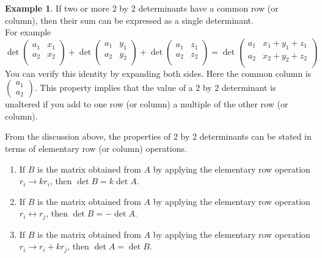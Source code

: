 \documentclass[11pt,a4paper]{article}
\theoremstyle{definition}
\newtheorem{exa}[thm]{Example}
\begin{document}
\begin{exa}
If two or more 2 by 2 determinants have a common row (or column), then their sum can be expressed as a single determinant.\\ For example $$\det
\begin{pmatrix}
a_1&x_1\\a_2&x_2\\
\end{pmatrix}
+\det
\begin{pmatrix}
a_1&y_1\\a_2&y_2\\
\end{pmatrix}
+\det
\begin{pmatrix}
a_1&z_1\\a_2&z_2\\
\end{pmatrix}
=\det
\begin{pmatrix}
a_1&x_1+y_1+z_1\\a_2&x_2+y_2+z_2\\
\end{pmatrix}
$$
You can verify this identity by expanding both sides. Here the common column is $
\begin{pmatrix}
a_1\\a_2
\end{pmatrix}
$. This property implies that the value of a 2 by 2 determinant is unaltered if you add to one row (or column) a multiple of the other row (or column).

From the discussion above, the properties of 2 by 2 determinants can be stated in terms of elementary row (or column) operations.
\begin{enumerate}
\item[i.] If $B$ is the matrix obtained from $A$ by applying the elementary row operation $r_i\longrightarrow kr_i$, then $\det B=k\det A$.
\item[ii.] If $B$ is the matrix obtained from $A$ by applying the elementary row operation $r_i\longleftrightarrow r_j$, then $\det B=-\det A$.
\item[iii.] If $B$ is the matrix obtained from $A$ by applying the elementary row operation $r_i\longrightarrow r_i+kr_j$, then $\det A=\det B$.
\end{enumerate} 
\end{exa}
\end{document}

